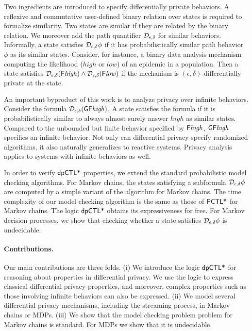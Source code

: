 
Two ingredients are introduced to specify differentially private
behaviors. A reflexive and commutative user-defined binary relation
over states is required to formalize similarity. Two states are
similar if they are related by the binary relation. We moreover add
the path quantifier $\mathcal{D}_{{\epsilon}, {\delta}}$ for similar
behaviors. Informally, a state satisfies $\mathcal{D}_{{\epsilon}, {\delta}}
\phi$ if it has probabilistically similar path behavior $\phi$ as
its similar states. Consider, for instance, a binary data analysis
mechanism computing the likelihood ($\mathit{high}$ or $\mathit{low}$)
of an epidemic in a population. Then a state satisfies
$\mathcal{D}_{{\epsilon}, {\delta}} (\mathsf{F} \mathit{high}) \wedge
\mathcal{D}_{{\epsilon}, {\delta}} (\mathsf{F} \mathit{low})$ if the mechanism is
$(\epsilon, \delta)$-differentially private at the state.


An important byproduct of this work is to analyze privacy over
infinite behaviors. Consider the formula $\mathcal{D}_{{\epsilon}, {\delta}}
(\mathsf{G} \mathsf{F} \mathit{high})$. A state satisfies the formula if it
is probabilistically similar to always almost surely
answer $\mathit{high}$ as similar states. Compared to the unbounded
but finite behavior specified by $\mathsf{F} \mathit{high}$,
$\mathsf{G} \mathsf{F} \mathit{high}$ specifies an infinite behavior.
Not only can differential privacy specify randomized algorithms, it
also naturally generalizes to reactive systems.
Privacy analysis applies to systems with infinite behaviors as well.


In order to verify $\textsf{dpCTL*}$ properties, we extend the standard
probabilistic model checking algorithms. For Markov chains, the states
satisfying a subformula $\mathcal{D}_{{\epsilon}, {\delta}} \phi$ are computed
by a simple variant of the algorithm for Markov chains.
The time complexity of our model checking algorithm is the same as
those of $\textsf{PCTL*}$ for Markov chains. The logic $\textsf{dpCTL*}$ obtains its
expressiveness for free. 
For Markov decision processes, we show that checking whether a state
satisfies $\mathcal{D}_{{\epsilon}, {\delta}} \phi$ is undecidable.


\paragraph{Contributions.} Our main contributions are three folds. (i)
We introduce the logic $\textsf{dpCTL*}$ for reasoning about properties in 
differential privacy. We use the logic to express classical
differential privacy properties, and moreover, complex properties such as those 
involving infinite behaviors can also be expressed. (ii) We model several differential privacy mechanisms, including the streaming process, in Markov chains or MDPs.
(iii) We show that the model checking problem 
problem for Markov chains is standard. For MDPs we show that it is undecidable.  
